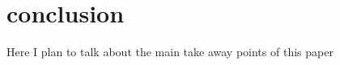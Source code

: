 \documentclass{sig-alternate}
\begin{document}
\section{conclusion}
Here I plan to talk about the main take away points of this paper



  

\end{document}

